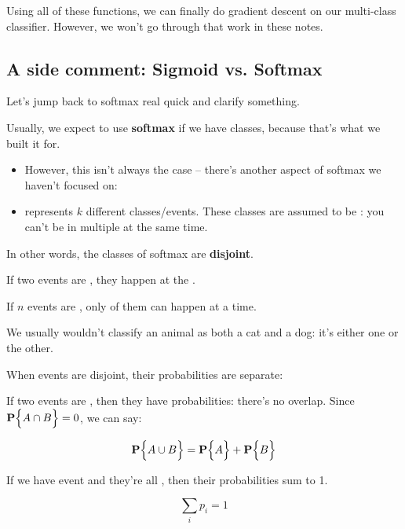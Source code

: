         Using all of these functions, we can finally do gradient descent on our multi-class classifier. However, we won't go through that work in these notes.

        
    \subsection{A side comment: Sigmoid vs. Softmax}

            Let's jump back to softmax real quick and clarify something.

            Usually, we expect to use \textbf{softmax} if we have  classes, because that's what we built it for.

            \begin{itemize}
                \item However, this isn't always the case -- there's another aspect of softmax we haven't focused on:
                \item {} represents $k$ different classes/events. These classes are assumed to be : you can't be in multiple at the same time.
            \end{itemize}

            In other words, the classes of softmax are \textbf{disjoint}.\\

            \begin{definition}
                If two events are , they  happen at the .

                If $n$ events are , only  of them can happen at a time.
            \end{definition}

            \miniex We usually wouldn't classify an animal as both a cat and a dog: it's either one or the other.

            When events are disjoint, their probabilities are separate:\\

            \begin{concept}
                If two events are , then they have  probabilities: there's no overlap. Since $\mathbf{P} \Bigl\{A \cap B\Bigr\}=0$, we can say:

                \begin{equation*}
                    \mathbf{P} \Bigl\{A \cup B\Bigr\} = \mathbf{P} \Bigl\{A\Bigr\}+\mathbf{P} \Bigl\{B\Bigr\}
                \end{equation*}

                If we have  event and they're all , then their probabilities sum to 1.

                \begin{equation}
                    \sum_i p_i = 1
                \end{equation}
            \end{concept}

